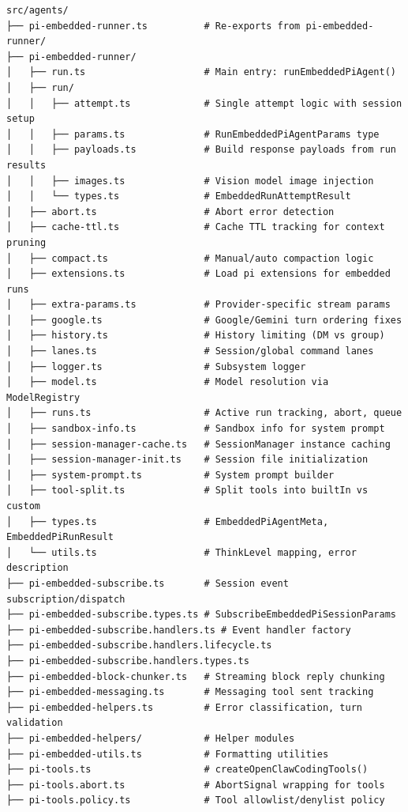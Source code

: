 \begin{lstlisting}
src/agents/
├── pi-embedded-runner.ts          # Re-exports from pi-embedded-runner/
├── pi-embedded-runner/
│   ├── run.ts                     # Main entry: runEmbeddedPiAgent()
│   ├── run/
│   │   ├── attempt.ts             # Single attempt logic with session setup
│   │   ├── params.ts              # RunEmbeddedPiAgentParams type
│   │   ├── payloads.ts            # Build response payloads from run results
│   │   ├── images.ts              # Vision model image injection
│   │   └── types.ts               # EmbeddedRunAttemptResult
│   ├── abort.ts                   # Abort error detection
│   ├── cache-ttl.ts               # Cache TTL tracking for context pruning
│   ├── compact.ts                 # Manual/auto compaction logic
│   ├── extensions.ts              # Load pi extensions for embedded runs
│   ├── extra-params.ts            # Provider-specific stream params
│   ├── google.ts                  # Google/Gemini turn ordering fixes
│   ├── history.ts                 # History limiting (DM vs group)
│   ├── lanes.ts                   # Session/global command lanes
│   ├── logger.ts                  # Subsystem logger
│   ├── model.ts                   # Model resolution via ModelRegistry
│   ├── runs.ts                    # Active run tracking, abort, queue
│   ├── sandbox-info.ts            # Sandbox info for system prompt
│   ├── session-manager-cache.ts   # SessionManager instance caching
│   ├── session-manager-init.ts    # Session file initialization
│   ├── system-prompt.ts           # System prompt builder
│   ├── tool-split.ts              # Split tools into builtIn vs custom
│   ├── types.ts                   # EmbeddedPiAgentMeta, EmbeddedPiRunResult
│   └── utils.ts                   # ThinkLevel mapping, error description
├── pi-embedded-subscribe.ts       # Session event subscription/dispatch
├── pi-embedded-subscribe.types.ts # SubscribeEmbeddedPiSessionParams
├── pi-embedded-subscribe.handlers.ts # Event handler factory
├── pi-embedded-subscribe.handlers.lifecycle.ts
├── pi-embedded-subscribe.handlers.types.ts
├── pi-embedded-block-chunker.ts   # Streaming block reply chunking
├── pi-embedded-messaging.ts       # Messaging tool sent tracking
├── pi-embedded-helpers.ts         # Error classification, turn validation
├── pi-embedded-helpers/           # Helper modules
├── pi-embedded-utils.ts           # Formatting utilities
├── pi-tools.ts                    # createOpenClawCodingTools()
├── pi-tools.abort.ts              # AbortSignal wrapping for tools
├── pi-tools.policy.ts             # Tool allowlist/denylist policy

\end{lstlisting}
